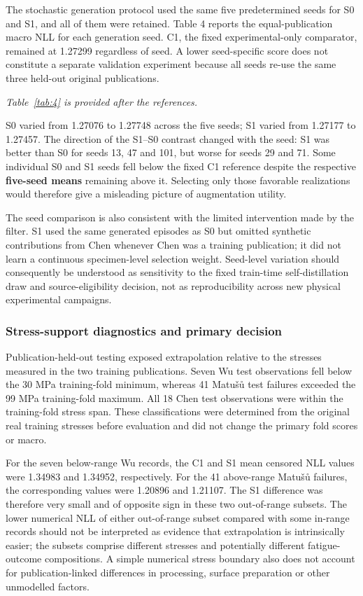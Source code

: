 \documentclass[12pt,a4paper]{article}
\begin{document}
The stochastic generation protocol used the same five predetermined seeds for S0 and S1, and all of them were retained. Table 4 reports the equal-publication macro NLL for each generation seed. C1, the fixed experimental-only comparator, remained at 1.27299 regardless of seed. A lower seed-specific score does not constitute a separate validation experiment because all seeds re-use the same three held-out original publications.

\noindent\textit{Table~\ref{tab:4} is provided after the references.}\par

S0 varied from 1.27076 to 1.27748 across the five seeds; S1 varied from 1.27177 to 1.27457. The direction of the S1–S0 contrast changed with the seed: S1 was better than S0 for seeds 13, 47 and 101, but worse for seeds 29 and 71. Some individual S0 and S1 seeds fell below the fixed C1 reference despite the respective \textbf{five-seed means} remaining above it. Selecting only those favorable realizations would therefore give a misleading picture of augmentation utility.

The seed comparison is also consistent with the limited intervention made by the filter. S1 used the same generated episodes as S0 but omitted synthetic contributions from Chen whenever Chen was a training publication; it did not learn a continuous specimen-level selection weight. Seed-level variation should consequently be understood as sensitivity to the fixed train-time self-distillation draw and source-eligibility decision, not as reproducibility across new physical experimental campaigns.

\subsubsection{Stress-support diagnostics and primary decision}

Publication-held-out testing exposed extrapolation relative to the stresses measured in the two training publications. Seven Wu test observations fell below the 30 MPa training-fold minimum, whereas 41 Matušů test failures exceeded the 99 MPa training-fold maximum. All 18 Chen test observations were within the training-fold stress span. These classifications were determined from the original real training stresses before evaluation and did not change the primary fold scores or macro.

For the seven below-range Wu records, the C1 and S1 mean censored NLL values were 1.34983 and 1.34952, respectively. For the 41 above-range Matušů failures, the corresponding values were 1.20896 and 1.21107. The S1 difference was therefore very small and of opposite sign in these two out-of-range subsets. The lower numerical NLL of either out-of-range subset compared with some in-range records should not be interpreted as evidence that extrapolation is intrinsically easier; the subsets comprise different stresses and potentially different fatigue-outcome compositions. A simple numerical stress boundary also does not account for publication-linked differences in processing, surface preparation or other unmodelled factors.
\end{document}
